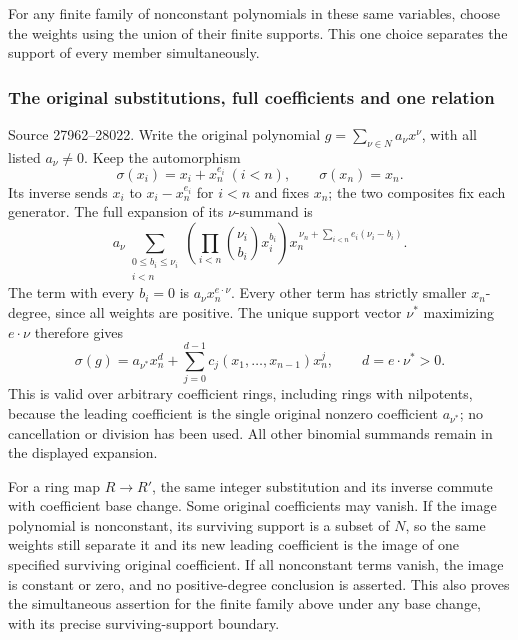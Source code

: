 For any finite family of nonconstant polynomials in these same variables, choose the weights using the union of their finite supports. This one choice separates the support of every member simultaneously.

\subsubsection{The original substitutions, full coefficients and one relation}\label{the-original-substitutions-full-coefficients-and-one-relation}

Source 27962--28022. Write the original polynomial \(g=\sum_{\nu\in N}a_\nu x^\nu\), with all listed \(a_\nu\ne0\). Keep the automorphism \[
 \sigma(x_i)=x_i+x_n^{e_i}\ (i<n),\qquad \sigma(x_n)=x_n.
\] Its inverse sends \(x_i\) to \(x_i-x_n^{e_i}\) for \(i<n\) and fixes \(x_n\); the two composites fix each generator. The full expansion of its \(\nu\)-summand is \[
 a_\nu\sum_{\substack{0\leq b_i\leq\nu_i\\i<n}}
 \left(\prod_{i<n}\binom{\nu_i}{b_i}x_i^{b_i}\right)
 x_n^{\,\nu_n+\sum_{i<n}e_i(\nu_i-b_i)}.
\] The term with every \(b_i=0\) is \(a_\nu x_n^{e\cdot\nu}\). Every other term has strictly smaller \(x_n\)-degree, since all weights are positive. The unique support vector \(\nu^*\) maximizing \(e\cdot\nu\) therefore gives \[
 \sigma(g)=a_{\nu^*}x_n^{d}
              +\sum_{j=0}^{d-1}c_j(x_1,\ldots,x_{n-1})x_n^j,
 \qquad d=e\cdot\nu^*>0 .
\] This is valid over arbitrary coefficient rings, including rings with nilpotents, because the leading coefficient is the single original nonzero coefficient \(a_{\nu^*}\); no cancellation or division has been used. All other binomial summands remain in the displayed expansion.

For a ring map \(R\to R'\), the same integer substitution and its inverse commute with coefficient base change. Some original coefficients may vanish. If the image polynomial is nonconstant, its surviving support is a subset of \(N\), so the same weights still separate it and its new leading coefficient is the image of one specified surviving original coefficient. If all nonconstant terms vanish, the image is constant or zero, and no positive-degree conclusion is asserted. This also proves the simultaneous assertion for the finite family above under any base change, with its precise surviving-support boundary.

